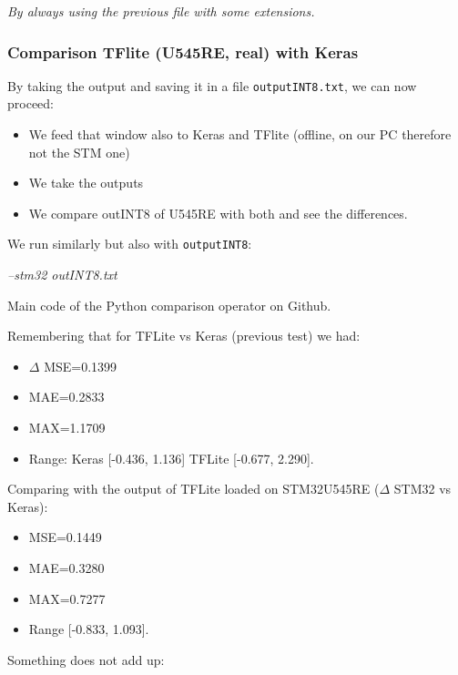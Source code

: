 \begin{center}
    \textit{By always using the previous file with some extensions.}
\end{center}


\subsubsection{Comparison TFlite (U545RE, real) with Keras}
By taking the output and saving it in a file \texttt{outputINT8.txt}, we can now proceed:

\begin{itemize}
    \item We feed that window also to Keras and TFlite (offline, on our PC therefore not the STM one) 
    \item We take the outputs 
    \item We compare outINT8 of U545RE with both and see the differences.
\end{itemize}
We run similarly but also with \texttt{outputINT8}:

\begin{center}
    \textit{--stm32 outINT8.txt}
\end{center}

Main code of the Python comparison operator on Github.

Remembering that for TFLite vs Keras (previous test) we had: 

\begin{itemize}
    \item $\Delta$ MSE=0.1399
    \item MAE=0.2833
    \item MAX=1.1709 
    \item Range: Keras [-0.436, 1.136] \quad TFLite [-0.677, 2.290].
\end{itemize}
Comparing with the output of TFLite loaded on STM32U545RE ($\Delta$ STM32 vs Keras): 

\begin{itemize}
    \item MSE=0.1449
    \item MAE=0.3280
    \item MAX=0.7277
    \item Range [-0.833, 1.093].
\end{itemize}

Something does not add up:

